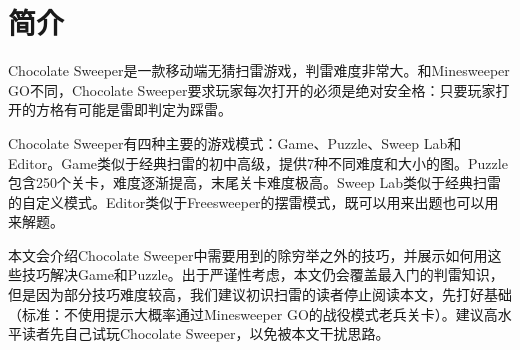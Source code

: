 \section{简介}
Chocolate Sweeper是一款移动端无猜扫雷游戏，判雷难度非常大。和Minesweeper GO不同，Chocolate Sweeper要求玩家每次打开的必须是绝对安全格：只要玩家打开的方格有可能是雷即判定为踩雷。

Chocolate Sweeper有四种主要的游戏模式：Game、Puzzle、Sweep Lab和Editor。Game类似于经典扫雷的初中高级，提供7种不同难度和大小的图。Puzzle包含250个关卡，难度逐渐提高，末尾关卡难度极高。Sweep Lab类似于经典扫雷的自定义模式。Editor类似于Freesweeper的摆雷模式，既可以用来出题也可以用来解题。

本文会介绍Chocolate Sweeper中需要用到的除穷举之外的技巧，并展示如何用这些技巧解决Game和Puzzle。出于严谨性考虑，本文仍会覆盖最入门的判雷知识，但是因为部分技巧难度较高，我们建议初识扫雷的读者停止阅读本文，先打好基础（标准：不使用提示大概率通过Minesweeper GO的战役模式老兵关卡）。建议高水平读者先自己试玩Chocolate Sweeper，以免被本文干扰思路。

